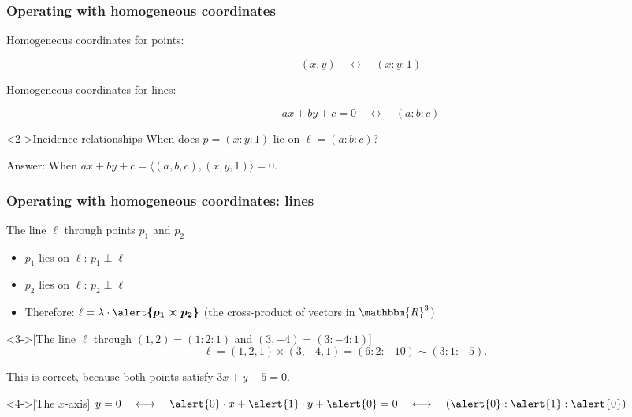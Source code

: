 \documentclass{beamer}
\newcommand{\RR}{\mathbbm{R}}
\newcommand{\yellowtext}[1]{\mbox{\color{yellow}#1}}
\begin{document}
\begin{frame}
  \frametitle{Operating with homogeneous coordinates}

  \begin{description}
  \item[Homogeneous coordinates for \alert{points}:]
    $$(x,y)\quad\longleftrightarrow\quad(x:y:1)$$
  \item[Homogeneous coordinates for \alert{lines}:]
    $$ax+by+c=0\quad\longleftrightarrow\quad(a:b:c)$$
  \end{description}

  \begin{block}<2->{Incidence relationships}
    When does $p=(x:y:1)$ lie on $\ell=(a:b:c)$?

    \medskip
    \alert{Answer:} When $ax+by+c =
    \big\langle(a,b,c),(x,y,1)\big\rangle = 0$.
    \qquad{}
  \end{block}
  
\end{frame}


\begin{frame}
  \frametitle{Operating with homogeneous coordinates: \yellowtext{lines}}

  \begin{block}{The line $\ell$ through points $p_1$ and $p_2$}
    \begin{itemize}
    \item $p_1$ lies on $\ell$: \qquad $p_1\perp\ell$
    \item $p_2$ lies on $\ell$: \qquad $p_2\perp\ell$
    \item<2-> \alert{Therefore:} $\ell = \lambda \cdot
      \boldsymbol{\alert{p_1\times p_2}}$  \quad (the cross-product of
      vectors in $\RR^3$) 
    \end{itemize}
  \end{block}

  \begin{example}<3->[\small The line $\ell$ through $(1,2)=(1:2:1)$ and $(3,-4)=(3:-4:1)$]
    $$\ell = (1,2,1)\times(3,-4,1) = (6:2:-10) \sim (3:1:-5).$$

    This is correct, because both points satisfy $3x+y-5 = 0$.
  \end{example}

  \begin{example}<4->[\small The $x$-axis]
    $y=0
    \quad\longleftrightarrow\quad 
    \alert{0}\cdot x + \alert{1}\cdot y + \alert{0} = 0
    \quad\longleftrightarrow\quad 
    (\alert{0}:\alert{1}:\alert{0})$
  \end{example}
\end{frame}
\end{document}
